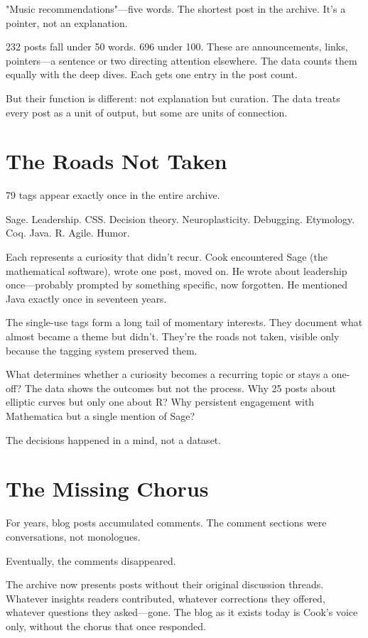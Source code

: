 "Music recommendations"—five words. The shortest post in the archive. It's a pointer, not an explanation.

232 posts fall under 50 words. 696 under 100. These are announcements, links, pointers—a sentence or two directing attention elsewhere. The data counts them equally with the deep dives. Each gets one entry in the post count.

But their function is different: not explanation but curation. The data treats every post as a unit of output, but some are units of connection.

\bigskip

\section*{The Roads Not Taken}

79 tags appear exactly once in the entire archive.

Sage. Leadership. CSS. Decision theory. Neuroplasticity. Debugging. Etymology. Coq. Java. R. Agile. Humor.

Each represents a curiosity that didn't recur. Cook encountered Sage (the mathematical software), wrote one post, moved on. He wrote about leadership once—probably prompted by something specific, now forgotten. He mentioned Java exactly once in seventeen years.

The single-use tags form a long tail of momentary interests. They document what almost became a theme but didn't. They're the roads not taken, visible only because the tagging system preserved them.

What determines whether a curiosity becomes a recurring topic or stays a one-off? The data shows the outcomes but not the process. Why 25 posts about elliptic curves but only one about R? Why persistent engagement with Mathematica but a single mention of Sage?

The decisions happened in a mind, not a dataset.

\bigskip

\section*{The Missing Chorus}

For years, blog posts accumulated comments. The comment sections were conversations, not monologues.

Eventually, the comments disappeared.

The archive now presents posts without their original discussion threads. Whatever insights readers contributed, whatever corrections they offered, whatever questions they asked—gone. The blog as it exists today is Cook's voice only, without the chorus that once responded.

